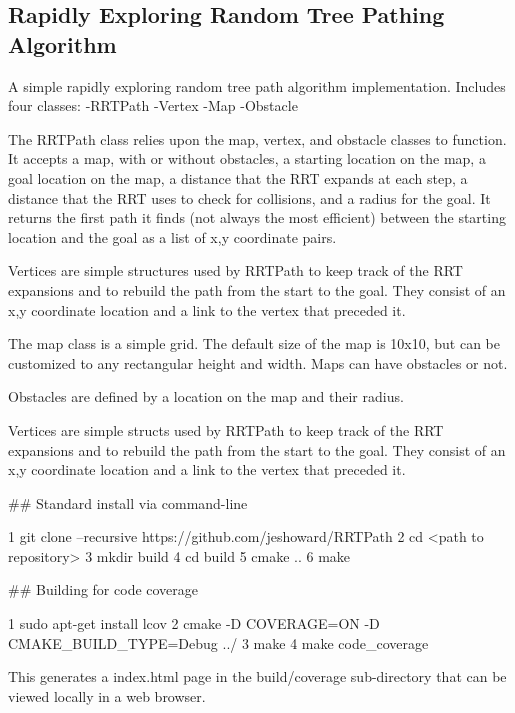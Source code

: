 \href{https://travis-ci.org/jeshoward/RRTPath}{\tt } \subsection*{\href{https://coveralls.io/github/jeshoward/RRTPath?branch=master}{\tt } }

\subsection*{Rapidly Exploring Random Tree Pathing Algorithm}

A simple rapidly exploring random tree path algorithm implementation. Includes four classes\+: -\/\+R\+R\+T\+Path -\/\+Vertex -\/\+Map -\/\+Obstacle

The R\+R\+T\+Path class relies upon the map, vertex, and obstacle classes to function. It accepts a map, with or without obstacles, a starting location on the map, a goal location on the map, a distance that the R\+RT expands at each step, a distance that the R\+RT uses to check for collisions, and a radius for the goal. It returns the first path it finds (not always the most efficient) between the starting location and the goal as a list of x,y coordinate pairs.

Vertices are simple structures used by R\+R\+T\+Path to keep track of the R\+RT expansions and to rebuild the path from the start to the goal. They consist of an x,y coordinate location and a link to the vertex that preceded it.

The map class is a simple grid. The default size of the map is 10x10, but can be customized to any rectangular height and width. Maps can have obstacles or not.

Obstacles are defined by a location on the map and their radius.

Vertices are simple structs used by R\+R\+T\+Path to keep track of the R\+RT expansions and to rebuild the path from the start to the goal. They consist of an x,y coordinate location and a link to the vertex that preceded it.

\#\# Standard install via command-\/line 
\begin{DoxyCode}
1 git clone --recursive https://github.com/jeshoward/RRTPath
2 cd <path to repository>
3 mkdir build
4 cd build
5 cmake ..
6 make
\end{DoxyCode}


\#\# Building for code coverage 
\begin{DoxyCode}
1 sudo apt-get install lcov
2 cmake -D COVERAGE=ON -D CMAKE\_BUILD\_TYPE=Debug ../
3 make
4 make code\_coverage
\end{DoxyCode}
 This generates a index.\+html page in the build/coverage sub-\/directory that can be viewed locally in a web browser.

